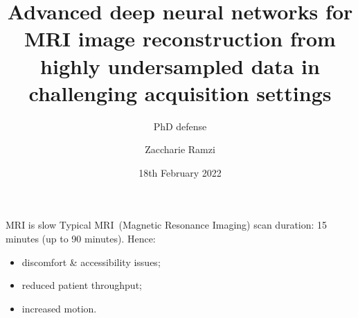 \documentclass[aspectratio=169,xcolor=dvipsnames]{beamer}
\title[Advanced deep neural networks for MRI image reconstruction]{Advanced deep neural networks for MRI image reconstruction from highly undersampled data in challenging acquisition settings
} %
\subtitle{PhD defense}
\author[Zaccharie] {Zaccharie Ramzi}
\institute[Inria-CEA] %
{
    Parietal team, Inria Saclay \\
    NeuroSpin and Cosmostat, CEA Saclay
}
\date{18th February 2022} %
\begin{document}
\begin{frame}
    \titlepage
\end{frame}

{
\begin{frame}[plain]
    \href{run:Sounds/mri_sounds.mp3}{\faPlayCircle}
\end{frame}
}

\begin{frame}{MRI is slow}
    Typical MRI~(Magnetic Resonance Imaging) scan duration: 15 minutes (up to 90 minutes).
    Hence:
    \begin{itemize}
        \item discomfort \& accessibility issues;
        \item reduced patient throughput;
        \item increased motion.
    \end{itemize}
\end{frame}
\end{document}
